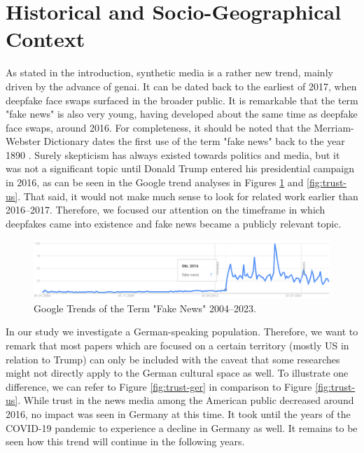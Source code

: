 \documentclass[
  a4paper,  %
  twoside,  %
  bibliography=totoc,
  headsepline,
  cleardoublepage=empty,
  parskip=half,
  draft=false
]{scrbook}
\begin{document}
\section{Historical and Socio-Geographical Context}
\label{sec:hist-context}
As stated in the introduction, synthetic media is a rather new trend, mainly driven by the advance of \gls{genai}. It can be dated back to the earliest of 2017, when deepfake face swaps surfaced in the broader public. It is remarkable that the term "fake news" is also very young, having developed about the same time as deepfake face swaps, around 2016. For completeness, it should be noted that the Merriam-Webster Dictionary dates the first use of the term "fake news" back to the year 1890 \cite{merriam-websterdictionaryRealStoryFake}. Surely skepticism has always existed towards politics and media, but it was not a significant topic until Donald Trump entered his presidential campaign in 2016, as can be seen in the Google trend analyses in Figures \ref{fig:gtrend-fake-news} and \ref{fig:trust-us}. That said, it would not make much sense to look for related work earlier than 2016–2017. Therefore, we focused our attention on the timeframe in which deepfakes came into existence and fake news became a publicly relevant topic.

\begin{figure}[h]
  \centering
  \includegraphics[width=1\textwidth]{./graphics/gtrends_fakenews_1011-2311.png}
  \caption{Google Trends of the Term "Fake News" 2004–2023.}
  \label{fig:gtrend-fake-news}
\end{figure}

In our study we investigate a German-speaking population. Therefore, we want to remark that most papers which are focused on a certain territory (mostly US in relation to Trump) can only be included with the caveat that some researches might not directly apply to the German cultural space as well. To illustrate one difference, we can refer to Figure \ref{fig:trust-ger} in comparison to Figure \ref{fig:trust-us}. While trust in the news media among the American public decreased around 2016, no impact was seen in Germany at this time. It took until the years of the COVID-19 pandemic to experience a decline in Germany as well. It remains to be seen how this trend will continue in the following years.
\end{document}
